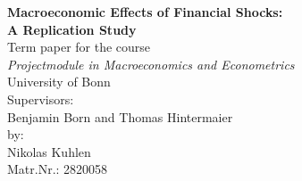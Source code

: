 \begin{titlepage}
\begin{center}

\textbf{\LARGE Macroeconomic Effects of Financial Shocks: \\A Replication Study}
\\[5cm]
\large 
Term paper for the course\\
\textit{Projectmodule in Macroeconomics and Econometrics}\\
University of Bonn\\
\vfill
Supervisors: \\
Benjamin Born and Thomas Hintermaier\\[2cm]

by:\\
Nikolas Kuhlen\\
Matr.Nr.: 2820058

\thispagestyle{empty}

\end{center}
\end{titlepage}
